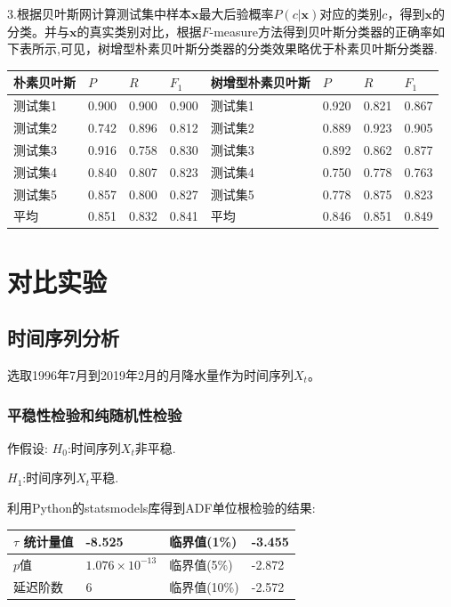 \documentclass{ctexart}
\begin{document}
3.根据贝叶斯网计算测试集中样本$\bm{x}$最大后验概率$P(c|\bm{x})$对应的类别$c$，得到$\bm{x}$的分类。并与$\bm{x}$的真实类别对比，根据$F$-measure方法得到贝叶斯分类器的正确率如下表所示,可见，树增型朴素贝叶斯分类器的分类效果略优于朴素贝叶斯分类器.
\begin{table}[!h]\center\small
\begin{tabular}{|l|l|l|l|l|l|l|l|}
\hline
朴素贝叶斯 & $P$&$R$&$F_{1}$&树增型朴素贝叶斯 & $P$&$R$&$F_{1}$\\
\hline
测试集1&0.900 & 0.900 & 0.900&测试集1&0.920 & 0.821 & 0.867\\
\hline
测试集2&0.742 & 0.896 & 0.812&测试集2&0.889 & 0.923 & 0.905\\
\hline
测试集3&0.916 & 0.758 & 0.830&测试集3&0.892 & 0.862 & 0.877\\
\hline
测试集4&0.840 &0.807 & 0.823&测试集4&0.750 & 0.778 & 0.763\\
\hline
测试集5&0.857 & 0.800 & 0.827&测试集5&0.778 & 0.875 & 0.823\\
\hline
平均&0.851& 0.832& 0.841&平均&0.846& 0.851 &0.849\\
\hline
\end{tabular}
\end{table}

\newpage

\section{对比实验}
\subsection{时间序列分析}

选取1996年7月到2019年2月的月降水量作为时间序列$X_{t}$。

\subsubsection{平稳性检验和纯随机性检验}

作假设:
\newline
\indent \indent$H_{0}$:时间序列$X_{t}$非平稳.

\indent\indent$H_{1}$:时间序列$X_{t}$平稳.

利用Python的statsmodels库得到ADF单位根检验的结果:

\begin{table}[!h]\center\small
\begin{tabular}{|l|l|l|l|}
\hline
$\tau$ 统计量值 &                 -8.525&临界值(1\%)        &      -3.455\\
\hline
$p$值   &     $1.076\times 10^{-13}$&临界值(5\%)            &      -2.872\\
\hline
延迟阶数       &         6&临界值(10\%)      &        -2.572\\
\hline
\end{tabular}
\end{table}
\end{document}
